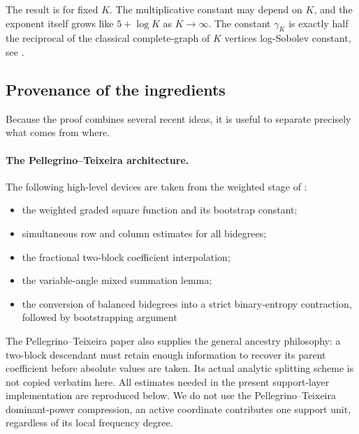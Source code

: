 \documentclass[11pt]{article}
\theoremstyle{definition}
\theoremstyle{remark}
\begin{document}
The result is for fixed $K$.  The multiplicative constant may depend on $K$,
and the exponent itself grows like $5+\log K$ as $K\to\infty$. The constant $\gamma_K$ is exactly half the reciprocal of the classical complete-graph of $K$ vertices log-Sobolev constant, see \cite{DiaconisSaloffCoste}.

\subsection{Provenance of the ingredients}
\label{subsec:provenance}

Because the proof combines several recent ideas, it is useful to separate
precisely what comes from where.

\paragraph{The Pellegrino--Teixeira architecture.}
The following high-level devices are taken from the weighted stage of
\cite{PellegrinoTeixeira}:
\begin{itemize}
\item the weighted graded square function and its bootstrap constant;
\item simultaneous row and column estimates for all bidegrees;
\item the fractional two-block coefficient interpolation;
\item the variable-angle mixed summation lemma;
\item the conversion of balanced bidegrees into a strict binary-entropy
contraction, followed by bootstrapping argument
\end{itemize}
The Pellegrino--Teixeira paper also supplies the general ancestry philosophy:
a two-block descendant must retain enough information to recover its parent
coefficient before absolute values are taken.  Its actual analytic splitting
scheme is not copied verbatim here.  All estimates needed in the present
support-layer implementation are reproduced below.  We do not use the
Pellegrino--Teixeira dominant-power compression, 
an active coordinate contributes
one support unit, regardless of its local frequency degree.
\end{document}
